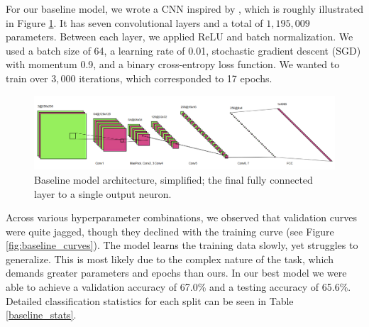 \documentclass{article} %
\begin{document}
For our baseline model, we wrote a CNN inspired by \citet{wang2020cnngeneratedimagessurprisinglyeasy}, which is roughly illustrated in Figure \ref{fig:baseline_arch}. It has seven convolutional layers and a total of $1,195,009$ parameters. Between each layer, we applied ReLU and batch normalization. We used a batch size of 64, a learning rate of 0.01, stochastic gradient descent (SGD) with momentum 0.9, and a binary cross-entropy loss function. We wanted to train over $3,000$ iterations, which corresponded to 17 epochs.

\begin{figure}[h]
    \begin{center}
        \includegraphics[scale=0.45]{figs/baseline.png}
    \end{center}
    \caption{Baseline model architecture, simplified; the final fully connected layer to a single output neuron.}
    \label{fig:baseline_arch}
\end{figure}

Across various hyperparameter combinations, we observed that validation curves were quite jagged, though they declined with the training curve (see Figure \ref{fig:baseline_curves}). The model learns the training data slowly, yet struggles to generalize. This is most likely due to the complex nature of the task, which demands greater parameters and epochs than ours. In our best model we were able to achieve a validation accuracy of 67.0\% and a testing accuracy of 65.6\%. Detailed classification statistics for each split can be seen in Table \ref{baseline_stats}.
\end{document}
